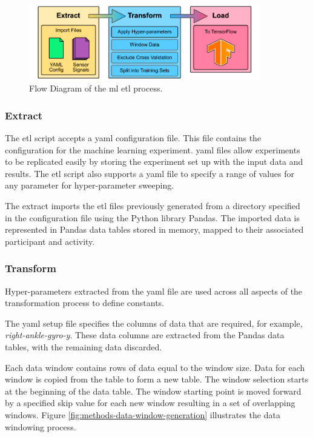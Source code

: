 \begin{figure}[!htb]
    \centering
    \includegraphics[width=0.9\textwidth]{content/3-Methods/ML_ETL.pdf}
    \caption[Flow Diagram of the   process]{Flow Diagram of the \acrlong{ml} \acrshort{etl} process.}
    \label{fig:methods_ml_ETL}
\end{figure}

\subsubsection{Extract}
The \acrshort{etl} script accepts a \acrshort{yaml} configuration file. This file contains the configuration for the machine learning experiment. \acrshort{yaml} files allow experiments to be replicated easily by storing the experiment set up with the input data and results. The \acrshort{etl} script also supports a \acrshort{yaml} file to specify a range of values for any parameter for hyper-parameter sweeping.

The extract imports the \acrshort{etl} files previously generated from a directory specified in the configuration file using the Python library Pandas. The imported data is represented in Pandas data tables stored in memory, mapped to their associated participant and activity.

\subsubsection{Transform}
Hyper-parameters extracted from the \acrshort{yaml} file are used across all aspects of the transformation process to define constants.

The \acrshort{yaml} setup file specifies the columns of data that are required, for example, \textit{right-ankle-gyro-y}. These data columns are extracted from the Pandas data tables, with the remaining data discarded.

Each data window contains rows of data equal to the window size. Data for each window is copied from the table to form a new table. The window selection starts at the beginning of the data table. The window starting point is moved forward by a specified skip value for each new window resulting in a set of overlapping windows. Figure \ref{fig:methods-data-window-generation} illustrates the data windowing process.

